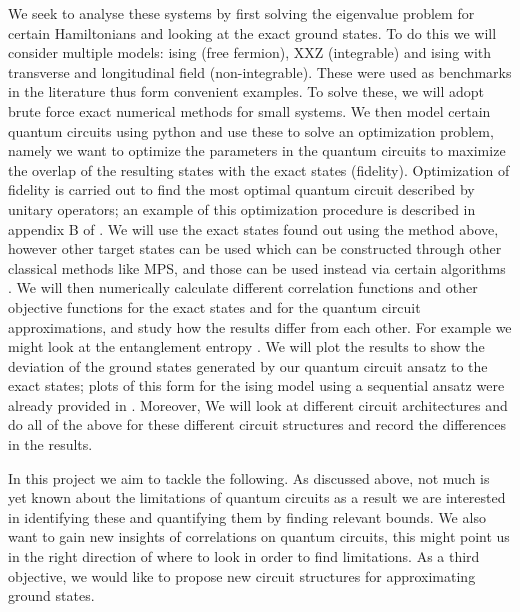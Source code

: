 \documentclass{physics_article}
\begin{document}
	We seek to analyse these systems by first solving the eigenvalue problem for certain Hamiltonians and looking at the exact ground states. To do this we will consider multiple models: ising (free fermion), XXZ (integrable) and ising with transverse and longitudinal field (non-integrable). These were used as benchmarks in the literature \cite{PhysRevResearch.4.L022020,PRXQuantum.2.010342,PhysRevResearch.4.033118} thus form convenient examples. To solve these, we will adopt brute force exact numerical methods for small systems. We then model certain quantum circuits using python and use these to solve an optimization problem, namely we want to optimize the parameters in the quantum circuits to maximize the overlap of the resulting states with the exact states (fidelity). Optimization of fidelity is carried out to find the most optimal quantum circuit described by unitary operators; an example of this optimization procedure is described in appendix B of \cite{PRXQuantum.2.010342}. We will use the exact states found out using the method above, however other target states can be used which can be constructed through other classical methods like MPS, and those can be used instead via certain algorithms \cite{PRXQuantum.2.010342}. We will then numerically calculate different correlation functions and other objective functions for the exact states and for the quantum circuit approximations, and study how the results differ from each other. For example we might look at the entanglement entropy \cite{PhysRevResearch.4.033118}. We will plot the results to show the deviation of the ground states generated by our quantum circuit ansatz to the exact states; plots of this form for the ising model using a sequential ansatz were already provided in \cite{PRXQuantum.2.010342}. Moreover, We will look at different circuit architectures and do all of the above for these different circuit structures and record the differences in the results.

	In this project we aim to tackle the following. As discussed above, not much is yet known about the limitations of quantum circuits as a result we are interested in identifying these and quantifying them by finding relevant bounds. We also want to gain  new insights of correlations on quantum circuits, this might point us in the right direction of where to look in order to find limitations. As a third objective, we would like to propose new circuit structures for approximating ground states. 

 	
 	
\end{document}
